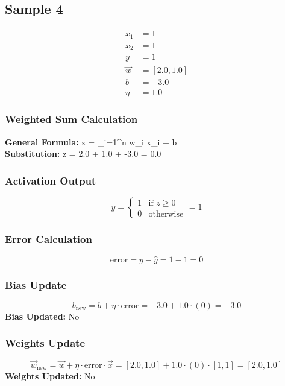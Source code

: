\documentclass{article}
\begin{document}
\subsection*{Sample 4}
\begin{align*}
x_1 &= 1 \\
x_2 &= 1 \\
y &= 1 \\
\vec{w} &= [2.0, 1.0] \\
b &= -3.0 \\
\eta &= 1.0
\end{align*}

\subsubsection*{Weighted Sum Calculation}
\textbf{General Formula:} \quad
z = \sum_{i=1}^{n} w_i x_i + b
\\
\textbf{Substitution:} \quad
z = 2.0  + 1.0  + -3.0 = 0.0

\subsubsection*{Activation Output}
\[
\hat{y} =
\begin{cases}
1 & \text{if } z \geq 0 \\
0 & \text{otherwise}
\end{cases}
= 1
\]

\subsubsection*{Error Calculation}
\[
\text{error} = y - \hat{y} = 1 - 1 = 0
\]

\subsubsection*{Bias Update}
\[
b_{\text{new}} = b + \eta \cdot \text{error} = -3.0 + 1.0 \cdot (0) = -3.0
\]
\textbf{Bias Updated:} No

\subsubsection*{Weights Update}
\[
\vec{w}_{\text{new}} = \vec{w} + \eta \cdot \text{error} \cdot \vec{x} = 
[2.0, 1.0] + 1.0 \cdot (0) \cdot [1, 1] = 
[2.0, 1.0]
\]
\textbf{Weights Updated:} No
\end{document}
